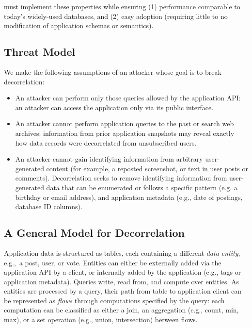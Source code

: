 \sys{} must implement these properties while ensuring (1) performance comparable to today’s
widely-used databases, and (2) easy adoption (requiring little to no modification of application
schemas or semantics).

\subsection{Threat Model} 
We make the following assumptions of an attacker whose goal is to break decorrelation:
\begin{itemize}
    \item An attacker can perform only those queries allowed by the application API: an
attacker can access the application only via its public interface. 

    \item An attacker cannot perform application queries to the past or search web archives:
    information from prior application snapshots may reveal 
    exactly how data records were decorrelated from unsubscribed users. 

    \item An attacker cannot gain identifying information from arbitrary user-generated content (for
        example, a reposted screenshot, or text in user posts or comments). Decorrelation seeks to
        remove identifying information from user-generated data that can be enumerated or follows a
        specific pattern (e.g. a birthday or email address), and application metadata (e.g., date
        of postings, database ID columns).
\end{itemize}

\subsection{A General Model for Decorrelation}
Application data is structured as tables, each containing a different \emph{data entity},
e.g.,\ a post, user, or vote. 
Entities can either be externally added via the application API by a client, or internally added by
the application (e.g., tags or application metadata).
Queries write, read from, and compute over entities. 
As entities are processed by a query, their path from table to application client can be represented
as \emph{flows} through computations specified by the query: each computation 
can be classified as either a join, an aggregation (e.g., count, min, max), or a set operation (e.g., union,
intersection) between flows.

